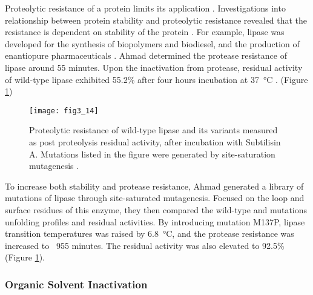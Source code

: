 \begin{refsection}
Proteolytic resistance of a protein limits its application
\cite{Ottesen1967,Daniel1982,Fontana2004}. Investigations into relationship
between protein stability and proteolytic resistance revealed that the
resistance is dependent on stability of the protein \cite{Daniel1982,
Parsell1989}. For example,  lipase was developed for the
synthesis of biopolymers and biodiesel, and the production of enantiopure
pharmaceuticals \cite{Jaeger2002,Ahmad2012}. Ahmad  determined
the protease resistance of lipase around 55 minutes. Upon the inactivation from
protease, residual activity of wild-type lipase exhibited 55.2\% after four
hours incubation at \SI{37}{\celsius} \cite{Ahmad2012}. (Figure
\ref{fig:protease-resistance})
\begin{figure}[htbp] \centering \texttt{[image: fig3\_14]}
    \caption[Proteolytic resistance of wild-type lipase and its variants
    measured as post proteolysis residual activity, after incubation with
Subtilisin A. Mutations listed in the figure were generated by site-saturation
mutagenesis.]{Proteolytic resistance of wild-type lipase and its variants
    measured as post proteolysis residual activity, after incubation with
    Subtilisin A. Mutations listed in the figure were generated by
    site-saturation mutagenesis \cite{Ahmad2012}.}
    \label{fig:protease-resistance}
\end{figure}

To increase both stability and protease resistance, Ahmad 
generated a library of mutations of lipase through site-saturated mutagenesis.
Focused on the loop and surface residues of this enzyme, they then compared the
wild-type and mutations unfolding profiles and residual activities. By
introducing mutation M137P, lipase transition temperatures was raised by
\SI{6.8}{\celsius}, and the protease resistance was increased to ~955 minutes.
The residual activity was also elevated to 92.5\% \cite{Ahmad2012} (Figure
\ref{fig:protease-resistance}).

\subsubsection{Organic Solvent Inactivation}


\end{refsection}
